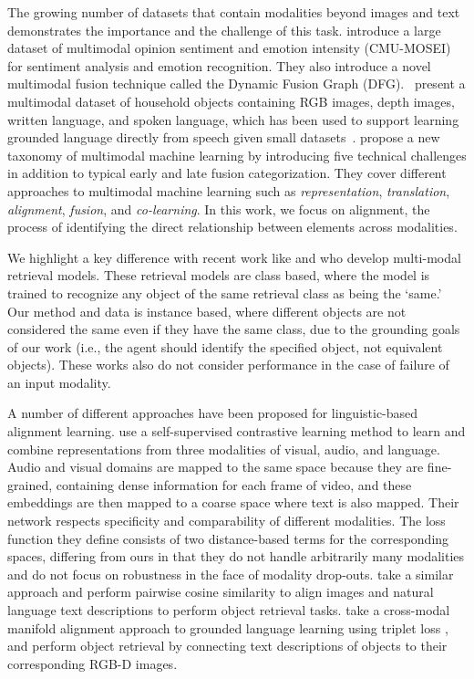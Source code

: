 \documentclass[10pt]{article} %
\begin{document}
The growing number of datasets that contain modalities beyond images and text demonstrates the importance and the challenge of this task. \citet{bagher-zadeh-etal-2018-multimodal} introduce a large dataset of multimodal opinion sentiment and emotion intensity (CMU-MOSEI) for sentiment analysis and emotion recognition. They also introduce a novel multimodal fusion technique called the Dynamic Fusion Graph (DFG).~\citet{GoLD_UMBC} present a multimodal dataset of household objects containing RGB images, depth images, written language, and spoken language, which has been used to support learning grounded language directly from speech given small datasets~\citep{KebeAAAI2022}. 
\citet{baltrusaitisMultimodalMachineLearning2019} propose a new taxonomy of multimodal machine learning by introducing five technical challenges in addition to typical early and late fusion categorization. They cover different approaches to multimodal machine learning such as \textit{representation}, \textit{translation}, \textit{alignment}, \textit{fusion}, and \textit{co-learning}. In this work, we focus on alignment, the process of identifying the direct relationship between elements across modalities.

We highlight a key difference with recent work like \citet{10.1145/3397271.3401232} and \citet{10.1145/3331184.3331213} who develop multi-modal retrieval models. These retrieval models are class based, where the model is trained to recognize any object of the same retrieval class as being the `same.' Our method and data is instance based, where different objects are not considered the same even if they have the same class, due to the grounding goals of our work (i.e., the agent should identify the specified object, not equivalent objects). These works also do not consider performance in the case of failure of an input modality. 

A number of different approaches have been proposed for linguistic-based alignment learning. \citet{alayrac2020self} use a self-supervised contrastive learning method to learn and combine representations from three modalities of visual, audio, and language. Audio and visual domains are mapped to the same space because they are fine-grained, containing dense information for each frame of video, and these embeddings are then mapped to a coarse space where text is also mapped. Their network respects specificity and comparability of different modalities. The loss function they define consists of two distance-based terms for the corresponding spaces, differing from ours in that they do not handle arbitrarily many modalities and do not focus on robustness in the face of modality drop-outs. \citet{Nguyen-RSS-20} take a similar approach and perform pairwise cosine similarity to align images and natural language text descriptions to perform object retrieval tasks. \citet{triplet_loss_2021_CVPR} take a cross-modal manifold alignment approach to grounded language learning using triplet loss \citep{Chechik:2010:LSO:1756006.1756042}, and perform object retrieval by connecting text descriptions of objects to their corresponding RGB-D images.
\end{document}

